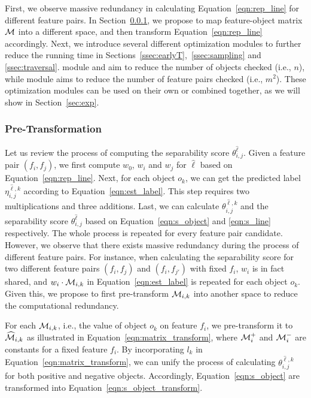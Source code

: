 First, we observe massive redundancy in calculating Equation~\ref{eqn:rep_line} for different feature pairs. In Section~\ref{ssec:trans}, we propose to map feature-object matrix $\mm$ into a different space, and then transform Equation~\ref{eqn:rep_line} accordingly. Next, we introduce several different optimization modules to further reduce the running time in Sections~\ref{ssec:earlyT},~\ref{ssec:sampling} and \ref{ssec:traversal}. module \earlyT and \sampling aim to reduce the number of objects checked (i.e., $n$), while module \traversal aims to reduce the number of feature pairs checked (i.e., $m^2$). These optimization modules can be used on their own or combined together, as we will show in Section~\ref{sec:exp}. 

\subsubsection{Pre-Transformation} \label{ssec:trans}
 Let us review the process of computing the separability score $\theta_{i,j}^{\hat{\ell}}$. Given a feature pair $(f_i,f_j)$, we first compute $w_0$, $w_i$ and $w_j$ for $\hat{\ell}$ based on Equation~\ref{eqn:rep_line}. Next, for each object $o_k$, we can get the predicted label $\eta_{i,j}^{\hat{\ell},k}$ according to Equation~\ref{eqn:est_label}. This step requires two multiplications and three additions. Last, we can calculate $\theta_{i,j}^{\hat{\ell},k}$ and the separability score $\theta_{i,j}^{\hat{\ell}}$ based on Equation~\ref{eqn:s_object} and \ref{eqn:s_line} respectively. The whole process is repeated for every feature pair candidate. However, we observe that there exists massive redundancy during the process of different feature pairs. For instance, when calculating the separability score for two different feature pairs $(f_i,f_j)$ and $(f_i,f_{j'})$ with fixed $f_i$, $w_i$ is in fact shared, and $w_i\cdot \mm_{i,k}$ in Equation~\ref{eqn:est_label} is repeated for each object $o_k$. Given this, we propose to first pre-transform $\mm_{i,k}$ into another space to reduce the computational redundancy.

 For each $\mm_{i,k}$, i.e., the value of object $o_k$ on feature $f_i$, we pre-transform it to $\widehat{\mm}_{i,k}$ as illustrated in Equation~\ref{eqn:matrix_transform}, where $\mm_i^+$ and $\mm_i^-$ are constants for a fixed feature $f_i$. By incorporating $l_k$ in Equation~\ref{eqn:matrix_transform}, we can unify the process of calculating $\theta_{i,j}^{\hat{\ell},k}$ for both positive and negative objects. Accordingly, Equation~\ref{eqn:s_object} are transformed into Equation~\ref{eqn:s_object_transform}.

